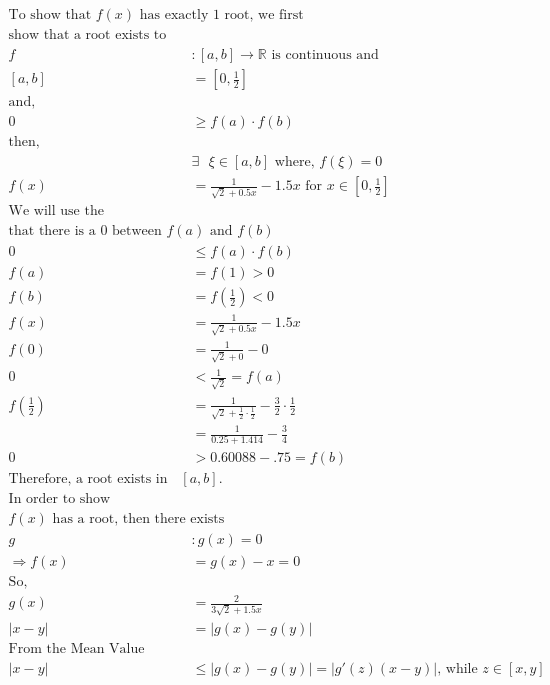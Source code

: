 \documentclass{article}
\begin{document}
\begin{align*}
    \text{To show that $f(x)$ has exactly 1 root, we first have to}&\\
    \text{show that a root exists to begin with. So, if}&\\
    f&:[a,b] \to \mathbb{R} \text{ is continuous and}\\
    [a,b] &= \left[0,\frac{1}{2}\right]\\
    \text{and,}&\\
    0 &\ge f(a) \cdot f(b)\\
    \text{then, }&\\
    &\exists \text{ } \xi \in [a,b] \text{ where, }f(\xi)=0 \\
    f(x)&= \frac{1}{\sqrt{2}+0.5x}-1.5x \text{ for }x \in \left[0,\frac{1}{2}\right] \\
    \text{We will use the intermediate value theorem to prove }&\\
    \text{that there is a 0 between $f(a)$ and $f(b)$ }&\\
    0 &\le f(a) \cdot f(b)\\
    f(a)&=f(1)>0\\
    f(b)&=f\left(\frac{1}{2}\right)<0 \\
    f(x) &= \frac{1}{\sqrt{2}+0.5x}-1.5x\\
    f(0)&= \frac{1}{\sqrt{2}+0}-0\\
    0&< \frac{1}{\sqrt{2}}=f(a)\\
    f\left(\frac{1}{2}\right) &= \frac{1}{\sqrt{2}+\frac{1}{2} \cdot \frac{1}{2}}-\frac{3}{2} \cdot \frac{1}{2}\\
    &= \frac{1}{0.25 + 1.414}-\frac{3}{4}\\
    0&> 0.60088 - .75 =f(b)\\
    \text{Therefore, a root exists in the interval $[a,b]$.}&\\
    \text{In order to show uniqueness we will say that since}&\\
    \text{$f(x)$ has a root, then there exists a}&\\
    g&:g(x)=0\\
    \Rightarrow f(x)&= g(x)-x=0\\
    \text{So,}&\\
    g(x)&= \frac{2}{3\sqrt{2}+1.5x}\\
    |x-y|&= |g(x)-g(y)|\\
    \text{From the Mean Value Theorem we get,}&\\
    |x-y|&\le |g(x)-g(y)|=|g'(z)(x-y)| \text{, while }z \in [x,y]\\

\end{align*}
\end{document}

